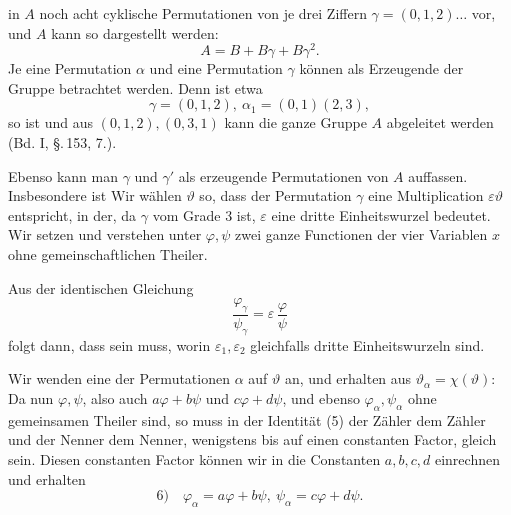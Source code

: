 in $A$ noch acht cyklische Permutationen von je drei Ziffern
$\gamma = (0, 1, 2) \ldots$ vor, und $A$ kann so dargestellt werden:
\[
A = B + B\gamma + B\gamma^2.
\]
Je eine Permutation $\alpha$ und eine Permutation $\gamma$ können als
Erzeugende der Gruppe betrachtet werden. Denn ist etwa
\[
\gamma = (0, 1, 2),\ \alpha_1 = (0, 1)(2, 3),
\]
so ist
und aus $(0, 1, 2), (0, 3, 1)$ kann die ganze Gruppe $A$ abgeleitet
werden (Bd. I, \S.\,153, 7.).

Ebenso kann man $\gamma$ und $\gamma'$ als erzeugende Permutationen
von $A$ auffassen. Insbesondere ist
Wir wählen $\vartheta$ so, dass der Permutation $\gamma$ eine Multiplication
$\varepsilon\vartheta$ entspricht, in der, da $\gamma$ vom Grade 3 ist, $\varepsilon$ eine dritte Einheitswurzel
 bedeutet. Wir setzen
und verstehen unter $\varphi, \psi$ zwei ganze Functionen der vier
Variablen $x$ ohne gemeinschaftlichen Theiler.

Aus der identischen Gleichung
\[
\frac{\varphi_\gamma}{\psi_\gamma} = \varepsilon\,\frac{\varphi}{\psi}
\]
folgt dann, dass
sein muss, worin $\varepsilon_1, \varepsilon_2$ gleichfalls dritte Einheitswurzeln sind.

Wir wenden eine der Permutationen $\alpha$ auf $\vartheta$ an, und erhalten
 aus $\vartheta_\alpha = \chi(\vartheta)$:
Da nun $\varphi, \psi$, also auch $a\varphi + b\psi$ und $c\varphi + d\psi$, und
ebenso $\varphi_\alpha, \psi_\alpha$ ohne gemeinsamen Theiler sind, so muss in der
Identität (5) der Zähler dem Zähler und der Nenner dem
Nenner, wenigstens bis auf einen constanten Factor, gleich sein.
Diesen constanten Factor können wir in die Constanten $a, b, c, d$
einrechnen und erhalten
\[
\text{6)}\quad \varphi_\alpha = a\varphi + b\psi,\ \psi_\alpha = c\varphi + d\psi.
\]
